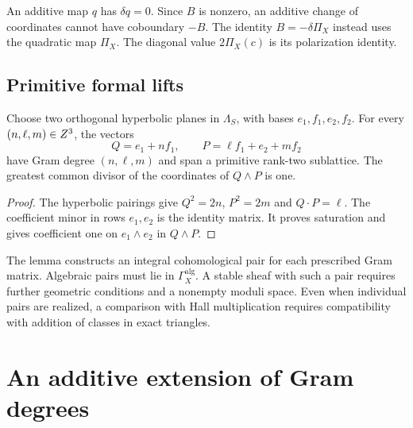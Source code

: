 \begin{remark}
\label{rem:B-quadratic-not-linear}
\label{rem:polarization-not-bott}
\label{rem:quadratic-obstruction}
An additive map $q$ has $\delta q=0$.  Since $B$ is nonzero, an
additive change of coordinates cannot have coboundary $-B$.
The identity $B=-\delta\Pi_X$ instead uses the quadratic map
$\Pi_X$.  The diagonal value $2\Pi_X(c)$ is its polarization identity.
\end{remark}

\subsection{Primitive formal lifts}
\label{subsec:formal-gram-triple-lift}

\begin{lemma}
\label{lem:primitive-lift-every-gram-triple}
Choose two orthogonal hyperbolic planes in $\Lambda_S$, with bases
$e_1,f_1,e_2,f_2$.  For every $(n,\ell,m)\in Z^3$, the vectors
\[
Q=e_1+nf_1,\qquad P=\ell f_1+e_2+mf_2
\]
have Gram degree $(n,\ell,m)$ and span a primitive rank-two sublattice.
The greatest common divisor of the coordinates of $Q\wedge P$ is one.
\end{lemma}

\begin{proof}
The hyperbolic pairings give $Q^2=2n$, $P^2=2m$ and $Q\cdot P=\ell$.
The coefficient minor in rows $e_1,e_2$ is the identity matrix.
It proves saturation and gives coefficient one on $e_1\wedge e_2$
in $Q\wedge P$.
\end{proof}

\begin{remark}
\label{rem:pointwise-not-hall-support}
The lemma constructs an integral cohomological pair for each prescribed
Gram matrix.  Algebraic pairs must lie in
$\Gamma_X^{\mathrm{alg}}$.  A stable sheaf with such a pair requires
further geometric conditions and a nonempty moduli space.  Even when
individual pairs are realized, a comparison with Hall multiplication
requires compatibility with addition of classes in exact triangles.
\end{remark}

\section{An additive extension of Gram degrees}
\label{sec:normal-ordered-extension}
\label{subsec:central-extension-additive-gram}

